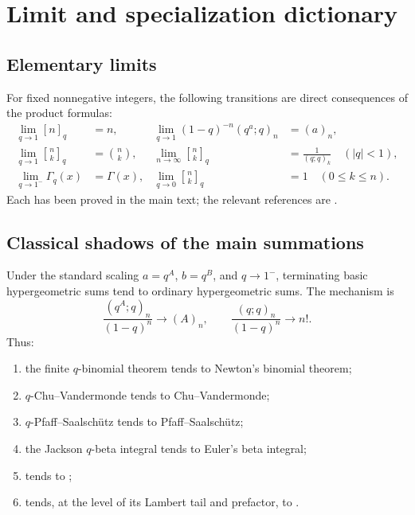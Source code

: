\documentclass[11pt,oneside,openany]{book}
\theoremstyle{definition}
\theoremstyle{remark}
\newcommand{\qbinom}[2]{\genfrac{[}{]}{0pt}{}{#1}{#2}_{q}}
\newcommand{\abs}[1]{\lvert #1\rvert}
\begin{document}
\chapter{Limit and specialization dictionary}\label{app:limits}

\section{Elementary limits}

For fixed nonnegative integers, the following transitions are direct consequences of the product formulas:
\begin{align*}
 \lim_{q\to1}[n]_q&=n,
 &\lim_{q\to1}(1-q)^{-n}(q^a;q)_n&=(a)_n,\\
 \lim_{q\to1}\qbinom nk&=\binom nk,
 &\lim_{n\to\infty}\qbinom nk&=\frac1{(q;q)_k}\quad(\abs q<1),\\
 \lim_{q\to1^-}\Gamma_q(x)&=\Gamma(x),
 &\lim_{q\to0}\qbinom nk&=1\quad(0\le k\le n).
\end{align*}
Each has been proved in the main text; the relevant references are .

\section{Classical shadows of the main summations}

Under the standard scaling $a=q^A$, $b=q^B$, and $q\to1^-$, terminating basic hypergeometric sums tend to ordinary hypergeometric sums.  The mechanism is
\[
 \frac{(q^A;q)_n}{(1-q)^n}\longrightarrow(A)_n,
 \qquad
 \frac{(q;q)_n}{(1-q)^n}\longrightarrow n!.
\]
Thus:
\begin{enumerate}
\item the finite $q$-binomial theorem tends to Newton's binomial theorem;
\item $q$-Chu--Vandermonde tends to Chu--Vandermonde;
\item $q$-Pfaff--Saalsch\"utz tends to Pfaff--Saalsch\"utz;
\item the Jackson $q$-beta integral tends to Euler's beta integral;
\item {} tends to ;
\item {} tends, at the level of its Lambert tail and prefactor, to .
\end{enumerate}
\end{document}
